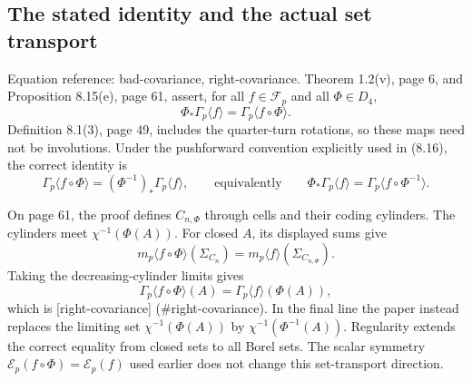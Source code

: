 \documentclass[10pt]{article}
\begin{document}
\subsection*{The stated identity and the actual set transport}
Equation reference: bad-covariance, right-covariance. Theorem 1.2(v), page 6, and Proposition 8.15(e), page 61, assert, for all \(f\in\mathcal F_p\) and all \(\Phi\in D_4\), \[
 \Phi_*\Gamma_p\langle f\rangle=\Gamma_p\langle f\circ\Phi\rangle.\] Definition 8.1(3), page 49, includes the quarter-turn rotations, so these maps need not be involutions. Under the pushforward convention explicitly used in (8.16), the correct identity is \[
 \Gamma_p\langle f\circ\Phi\rangle=(\Phi^{-1})_*\Gamma_p\langle f\rangle,
 \qquad\text{equivalently}\qquad
 \Phi_*\Gamma_p\langle f\rangle=\Gamma_p\langle f\circ\Phi^{-1}\rangle.\]\par
On page 61, the proof defines \(C_{n,\Phi}\) through cells and their coding cylinders. The cylinders meet \(\chi^{-1}(\Phi(A))\). For closed \(A\), its displayed sums give \[m_p\langle f\circ\Phi\rangle(\Sigma_{C_n})
 =m_p\langle f\rangle(\Sigma_{C_{n,\Phi}}).\] Taking the decreasing-cylinder limits gives \[\Gamma_p\langle f\circ\Phi\rangle(A)=\Gamma_p\langle f\rangle(\Phi(A)),\] which is [right-covariance] (\#right-covariance). In the final line the paper instead replaces the limiting set \(\chi^{-1}(\Phi(A))\) by \(\chi^{-1}(\Phi^{-1}(A))\). Regularity extends the correct equality from closed sets to all Borel sets. The scalar symmetry \(\mathcal E_p(f\circ\Phi)=\mathcal E_p(f)\) used earlier does not change this set-transport direction.\par
\end{document}
